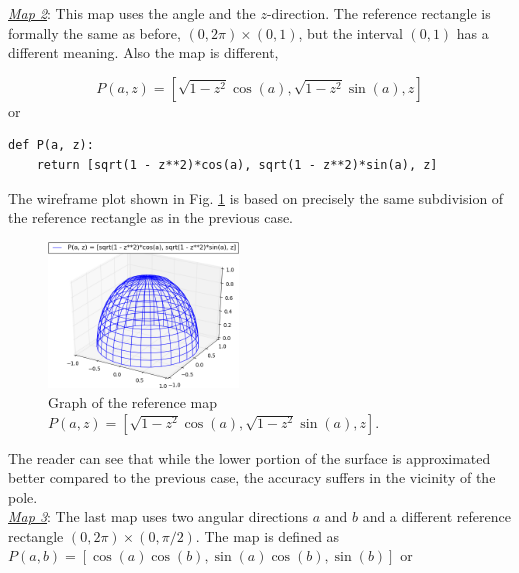 \noindent
\underline{\em Map 2}: This map uses the angle and the $z$-direction. The 
reference rectangle is formally the same as before, $(0, 2\pi)\times(0, 1)$,
but the interval $(0, 1)$ has a different meaning. Also the map is different,

$$
P(a, z) = \left[\sqrt{1 - z^2}\cos(a), \sqrt{1 - z^2}\sin(a), z\right]
$$
or\\

\begin{bbox}
\begin{verbatim}
def P(a, z): 
    return [sqrt(1 - z**2)*cos(a), sqrt(1 - z**2)*sin(a), z]
\end{verbatim}
\end{bbox}
\vspace{6mm}

\noindent
The wireframe plot shown in Fig. \ref{fig:paramsu3} is based on precisely the 
same subdivision of the reference rectangle as in the previous case. 
\newpage

\begin{figure}[!ht]
\begin{center}
\includegraphics[width=0.45\textwidth]{img/paramsu6.png}
\end{center}
\vspace{-6mm}
\caption{Graph of the reference map $P(a, z) = \left[\sqrt{1 - z^2}\cos(a), \sqrt{1 - z^2}\sin(a), z\right]$.}
\label{fig:paramsu3}
\end{figure}
\noindent
The reader can see that while the lower portion of the surface is approximated 
better compared to the previous case, the accuracy suffers in the vicinity of the pole.\\

\noindent
\underline{\em Map 3}: The last map uses two angular directions $a$ and $b$ and 
a different reference rectangle $(0, 2\pi)\times(0, \pi/2)$. The map is 
defined as
$
P(a, b) = \left[\cos(a)\cos(b), \sin(a)\cos(b), \sin(b)\right]
$
or\\

